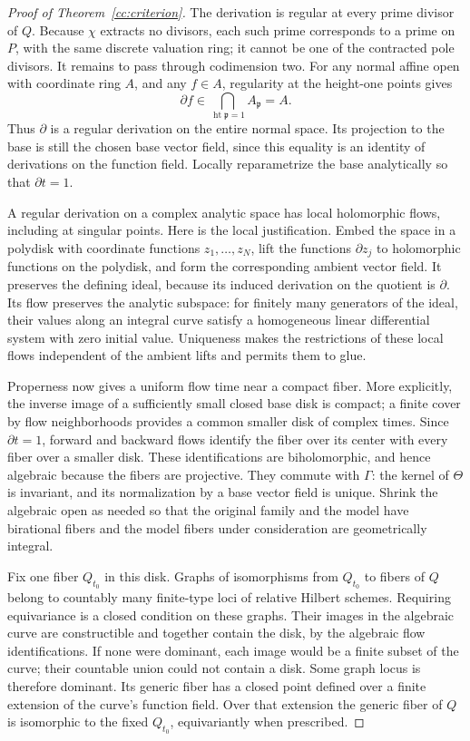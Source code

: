 \begin{proof}[Proof of Theorem~\ref{cc:criterion}]
The derivation is regular at every prime divisor of $Q$.  Because
$\chi$ extracts no divisors, each such prime corresponds to a prime on
$P$, with the same discrete valuation ring; it cannot be one of the
contracted pole divisors.  It remains to pass through codimension two.
For any normal affine open with coordinate ring $A$, and any $f\in A$,
regularity at the height-one points gives
\[
           \partial f\in\bigcap_{\operatorname{ht}\mathfrak p=1}
                                      A_{\mathfrak p}=A.
\]
Thus $\partial$ is a regular derivation on the entire normal space.
Its projection to the base is still the chosen base vector field,
since this equality is an identity of derivations on the function
field.  Locally reparametrize the base analytically so that
$\partial t=1$.

A regular derivation on a complex analytic space has local holomorphic
flows, including at singular points.  Here is the local justification.
Embed the space in a polydisk with coordinate functions $z_1,\ldots,z_N$,
lift the functions $\partial z_j$ to holomorphic functions on the
polydisk, and form the corresponding ambient vector field.  It
preserves the defining ideal, because its induced derivation on the
quotient is $\partial$.  Its flow preserves the analytic subspace:
for finitely many generators of the ideal, their values along an
integral curve satisfy a homogeneous linear differential system with
zero initial value.  Uniqueness makes the restrictions of these local
flows independent of the ambient lifts and permits them to glue.

Properness now gives a uniform flow time near a compact fiber.  More
explicitly, the inverse image of a sufficiently small closed base disk
is compact; a finite cover by flow neighborhoods provides a common
smaller disk of complex times.  Since $\partial t=1$, forward and backward
flows identify the fiber over its center with every fiber over a
smaller disk.  These identifications are biholomorphic, and hence
algebraic because the fibers are projective.  They commute with
$\Gamma$: the kernel of $\Theta$ is invariant, and its normalization by
a base vector field is unique.  Shrink the algebraic open as needed so
that the original family and the model have birational fibers and the
model fibers under consideration are geometrically integral.

Fix one fiber $Q_{t_0}$ in this disk.  Graphs of isomorphisms from
$Q_{t_0}$ to fibers of $Q$ belong to countably many finite-type loci of
relative Hilbert schemes.  Requiring equivariance is a closed condition
on these graphs.  Their images in the algebraic curve are constructible
and together contain the disk, by the algebraic flow identifications.
If none were dominant, each image would be a finite subset of the
curve; their countable union could not contain a disk.  Some graph
locus is therefore dominant.  Its generic fiber has a closed point
defined over a finite extension of the curve's function field.  Over
that extension the generic fiber of $Q$ is isomorphic to the fixed
$Q_{t_0}$, equivariantly when prescribed.


\end{proof}
